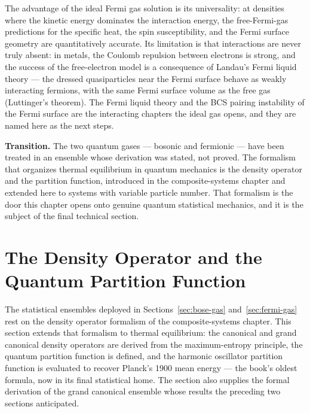The advantage of the ideal Fermi gas solution is its universality: at densities where the kinetic energy dominates the interaction energy, the free-Fermi-gas predictions for the specific heat, the spin susceptibility, and the Fermi surface geometry are quantitatively accurate. Its limitation is that interactions are never truly absent: in metals, the Coulomb repulsion between electrons is strong, and the success of the free-electron model is a consequence of Landau's Fermi liquid theory --- the dressed quasiparticles near the Fermi surface behave as weakly interacting fermions, with the same Fermi surface volume as the free gas (Luttinger's theorem). The Fermi liquid theory and the BCS pairing instability of the Fermi surface are the interacting chapters the ideal gas opens, and they are named here as the next steps.

\medskip\noindent\textbf{Transition.}
The two quantum gases --- bosonic and fermionic --- have been treated in an ensemble whose derivation was stated, not proved. The formalism that organizes thermal equilibrium in quantum mechanics is the density operator and the partition function, introduced in the composite-systems chapter and extended here to systems with variable particle number. That formalism is the door this chapter opens onto genuine quantum statistical mechanics, and it is the subject of the final technical section.

\section{The Density Operator and the Quantum Partition Function}
\label{sec:density-operator-partition}

The statistical ensembles deployed in Sections~\ref{sec:bose-gas} and~\ref{sec:fermi-gas} rest on the density operator formalism of the composite-systems chapter. This section extends that formalism to thermal equilibrium: the canonical and grand canonical density operators are derived from the maximum-entropy principle, the quantum partition function is defined, and the harmonic oscillator partition function is evaluated to recover Planck's 1900 mean energy --- the book's oldest formula, now in its final statistical home. The section also supplies the formal derivation of the grand canonical ensemble whose results the preceding two sections anticipated.

